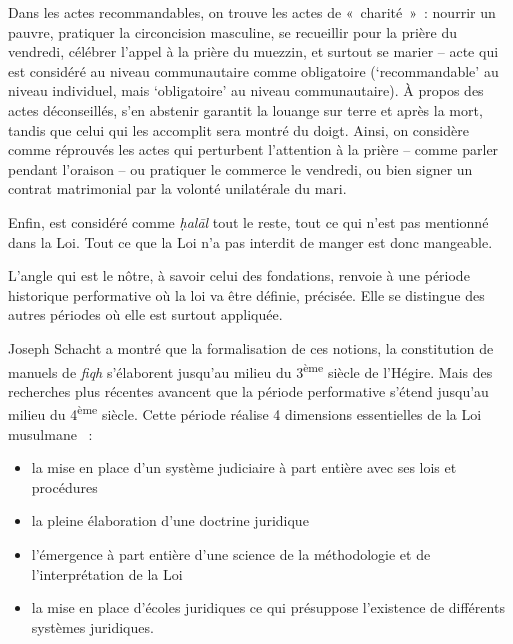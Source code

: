 Dans les actes recommandables, on trouve les actes de «~charité~»~:
nourrir un pauvre, pratiquer la circoncision masculine, se recueillir
pour la prière du vendredi, célébrer l'appel à la prière du muezzin, et
surtout se marier -- acte qui est considéré au niveau communautaire
comme obligatoire (`recommandable' au niveau individuel, mais
`obligatoire' au niveau communautaire). 
À propos des actes déconseillés,
s'en abstenir garantit la louange sur terre et après la mort, tandis que
celui qui les accomplit sera montré du doigt. Ainsi, on considère comme
réprouvés les actes qui perturbent l'attention à la prière -- comme
parler pendant l'oraison -- ou pratiquer le commerce le vendredi, ou
bien signer un contrat matrimonial par la volonté unilatérale du mari.

Enfin, est considéré comme \emph{ḥalāl} tout le reste, tout ce qui n'est
pas mentionné dans la Loi. Tout ce que la Loi n'a pas interdit de manger
est donc mangeable.

L'angle qui est le nôtre, à savoir celui des fondations, renvoie à une
période historique performative où la loi va être définie, précisée.
Elle se distingue des autres périodes où elle est surtout appliquée.

Joseph Schacht a montré que la formalisation de ces notions, la
constitution de manuels de \emph{fiqh} s'élaborent jusqu'au milieu du
3\textsuperscript{ème} siècle de l'Hégire. Mais des recherches plus
récentes avancent que la période performative s'étend jusqu'au milieu du
4\textsuperscript{ème} siècle. Cette période réalise 4 dimensions
essentielles de la Loi musulmane
~:

\begin{itemize}
\item
  la mise en place d'un système judiciaire à part entière avec ses lois
  et procédures
\item
  la pleine élaboration d'une doctrine juridique
\item
  l'émergence à part entière d'une science de la méthodologie et de
  l'interprétation de la Loi
\item
  la mise en place d'écoles juridiques ce qui présuppose l'existence de
  différents systèmes juridiques.
\end{itemize}

 
